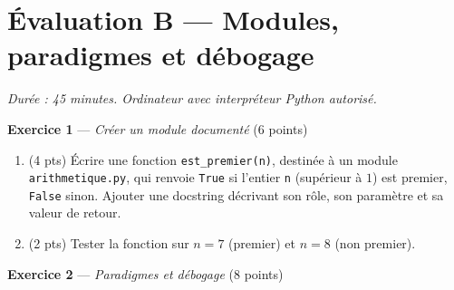 \section*{Évaluation B --- Modules, paradigmes et débogage}
\textit{Durée : 45 minutes. Ordinateur avec interpréteur Python autorisé.}


\bigskip

\textbf{Exercice 1} --- \textit{Créer un module documenté} \hfill (6 points)

\begin{enumerate}
  \item (4 pts) Écrire une fonction \lstinline{est_premier(n)}, destinée à un module \lstinline{arithmetique.py}, qui renvoie \lstinline{True} si l'entier \lstinline{n} (supérieur à $1$) est premier, \lstinline{False} sinon. Ajouter une docstring décrivant son rôle, son paramètre et sa valeur de retour.
  \item (2 pts) Tester la fonction sur $n=7$ (premier) et $n=8$ (non premier).
\end{enumerate}


\bigskip

\textbf{Exercice 2} --- \textit{Paradigmes et débogage} \hfill (8 points)

